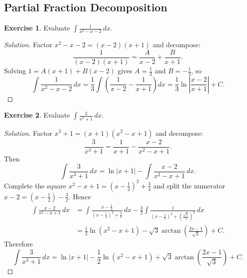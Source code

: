 \documentclass[11pt]{article}
\theoremstyle{definition}
\newtheorem{exercise}{Exercise}[section]
\newenvironment{solution}{\begin{proof}[Solution]}{\end{proof}}
\begin{document}
\subsection{Partial Fraction Decomposition}

\begin{exercise}
Evaluate $\displaystyle \int \frac{1}{x^2-x-2}\,dx$.
\end{exercise}

\begin{solution}
Factor $x^2-x-2=(x-2)(x+1)$ and decompose:
\[
\frac{1}{(x-2)(x+1)}=\frac{A}{x-2}+\frac{B}{x+1}.
\]
Solving $1=A(x+1)+B(x-2)$ gives $A=\frac{1}{3}$ and $B=-\frac{1}{3}$, so
\[
\int \frac{1}{x^2-x-2}\,dx
=\frac{1}{3}\int\left(\frac{1}{x-2}-\frac{1}{x+1}\right)dx
=\frac{1}{3}\ln\left|\frac{x-2}{x+1}\right|+C.
\]
\end{solution}

\begin{exercise}
Evaluate $\displaystyle \int \frac{3}{x^3+1}\,dx$.
\end{exercise}

\begin{solution}
Factor $x^3+1=(x+1)(x^2-x+1)$ and decompose:
\[
\frac{3}{x^3+1}=\frac{1}{x+1}-\frac{x-2}{x^2-x+1}.
\]
Then
\[
\int\frac{3}{x^3+1}\,dx=\ln|x+1|-\int\frac{x-2}{x^2-x+1}\,dx.
\]
Complete the square $x^2-x+1=\left(x-\frac{1}{2}\right)^2+\frac{3}{4}$ and split the numerator
$x-2=\left(x-\frac{1}{2}\right)-\frac{3}{2}$. Hence
\begin{align*}
\int\frac{x-2}{x^2-x+1}\,dx
&=\int\frac{x-\frac{1}{2}}{\left(x-\frac{1}{2}\right)^2+\frac{3}{4}}\,dx
-\frac{3}{2}\int\frac{1}{\left(x-\frac{1}{2}\right)^2+\left(\frac{\sqrt{3}}{2}\right)^2}\,dx \\
&=\frac{1}{2}\ln\left(x^2-x+1\right)-\sqrt{3}\arctan\left(\frac{2x-1}{\sqrt{3}}\right)+C.
\end{align*}
Therefore
\[
\int \frac{3}{x^3+1}\,dx=\ln|x+1|-\frac{1}{2}\ln\left(x^2-x+1\right)+\sqrt{3}\arctan\left(\frac{2x-1}{\sqrt{3}}\right)+C.
\]
\end{solution}
\end{document}
